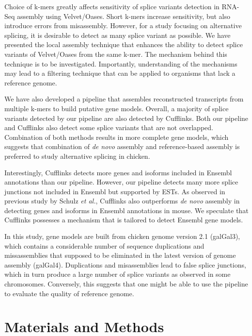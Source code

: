 \documentclass[10pt]{article}
\begin{document}
Choice of k-mers greatly affects sensitivity of splice variants detection in RNA-Seq assembly using Velvet/Oases.
Short k-mers increase sensitivity, but also introduce errors from misassembly.
However, for a study focusing on alternative splicing, it is desirable to detect as many splice variant as possible.
We have presented the local assembly technique that enhances the ability to detect splice variants of Velvet/Oases from the same
k-mer.
The mechanism behind this technique is to be investigated.
Importantly, understanding of the mechanisms may lead to a filtering technique that can be applied to organisms that lack a reference genome.

We have also developed a pipeline that assembles reconstructed transcripts from multiple k-mers to build putative gene models.
Overall, a majority of splice variants detected by our pipeline are also detected by Cufflinks.
Both our pipeline and Cufflinks also detect some splice variants that are not overlapped.
Combination of both methods results in more complete gene models,
which suggests that combination of \emph{de novo} assembly and reference-based assembly is preferred to study alternative splicing in chicken.

Interestingly, Cufflinks detects more genes and isoforms included in Ensembl annotations than our pipeline.
However, our pipeline detects many more splice junctions not included in Ensembl but supported by ESTs.
As observed in previous study by Schulz \emph{et al.}\cite{Schulz:2012je}, Cufflinks also outperforms \emph{de novo} assembly in
detecting genes and isoforms in Ensembl annotations in mouse.
We speculate that Cufflinks possesses a mechanism that is tailored to detect Ensembl gene models.

In this study, gene models are built from chicken genome version 2.1 (galGal3),
which contains a considerable number of sequence duplications and
missassemblies that supposed to be eliminated in the latest version of genome assembly (galGal4).
Duplications and misassemblies lead to false splice junctions, which in turn produce a large number of splice variants as
observed in some chromosomes.
Conversely, this suggests that one might be able to use the pipeline to evaluate the quality of reference genome.

\section*{Materials and Methods}
\end{document}
